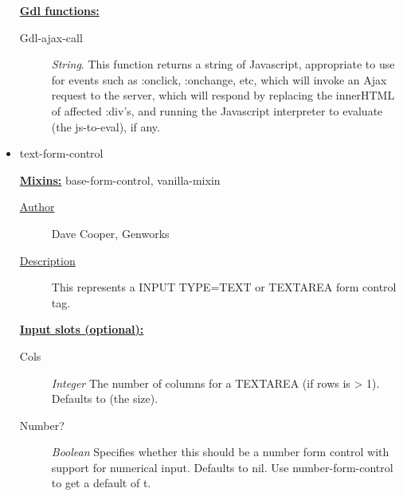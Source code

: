 \documentclass [11pt]{book}
\begin{document}
\begin{itemize}
\begin{description}
\end{description}






\textbf{
\underline{Gdl functions:}}

\begin{description}

\item [Gdl-ajax-call]
\emph{String}.
This function returns a string of Javascript, appropriate to use for events
such as :onclick, :onchange, etc, which will invoke an Ajax request to the
server, which will respond by replacing the innerHTML of affected :div's, and
running the Javascript interpreter to evaluate (the js-to-eval), if any.


\end{description}







\item {}text-form-control


\textbf{
\underline{Mixins:}} base-form-control, vanilla-mixin





\begin{description}

\item [
\underline{Author}]


Dave Cooper, Genworks



\item [
\underline{Description}]


This represents a INPUT TYPE=TEXT or TEXTAREA form control tag.



\end{description}








\textbf{
\underline{Input slots (optional):}}

\begin{description}

\item [Cols]
\emph{Integer} The number of columns for a TEXTAREA (if rows is > 1). Defaults to (the size).


\item [Number?]
\emph{Boolean} Specifies whether this should be a number form control with support for numerical input.
Defaults to nil. Use number-form-control to get a default of t.



\end{description}
\end{itemize}
\end{document}
